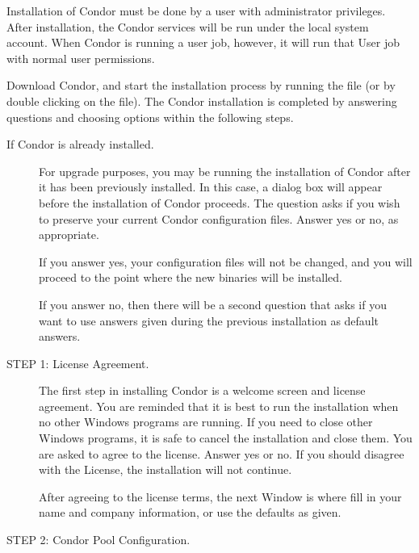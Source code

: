 % 

Installation of Condor must be done by a user with administrator privileges.
After installation, the Condor services will be run under the local system account.
When Condor is running a user job, however, it will run that User job with normal user permissions.

Download Condor, and start the installation process by running the file (or by double clicking on the file).
The Condor installation is completed by answering questions and choosing options within the following steps.


\begin{description}
\item[If Condor is already installed.]

     For upgrade purposes, you may be running the installation of Condor
     after it has been previously installed.
     In this case, a dialog box will appear before the
     installation of Condor proceeds.
     The question asks if you wish to preserve your current
     Condor configuration files.
     Answer yes or no, as appropriate.
	 
	 If you answer yes, your configuration files will not be changed, and you will proceed to the point where the new binaries will be installed.

     If you answer no, then there will be a second question
     that asks if you want to use answers
     given during the previous installation
     as default answers.

\item[STEP 1: License Agreement.]

     The first step in installing Condor
     is a welcome screen and license agreement.
     You are reminded that it is best to run the installation
     when no other Windows programs are running.
	 If you need to close other Windows programs, it is safe to cancel the
	 installation and close them.
     You are asked to agree to the license.
     Answer yes or no.  If you should disagree with the License, the
	 installation will not continue.

     After agreeing to the license terms, the next Window is where 
     fill in your name and company information,
     or use the defaults as given.

\item[STEP 2: Condor Pool Configuration.]


\end{description}
